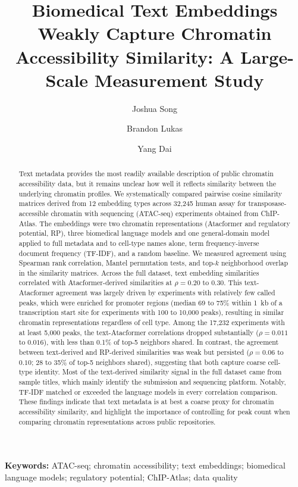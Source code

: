 \documentclass[12pt]{article}
\title{\textbf{Biomedical Text Embeddings Weakly Capture Chromatin Accessibility
Similarity: A Large-Scale Measurement Study}}
\author[1]{Joshua Song}
\author[1]{Brandon Lukas}
\author[1,*]{Yang Dai}
\affil[1]{Department of Biomedical Engineering, University of Illinois Chicago, Chicago, IL, USA}
\affil[*]{Corresponding author: \href{mailto:yangdai@uic.edu}{yangdai@uic.edu}}
\affil[ ]{Other authors: Joshua Song (\href{mailto:joshua.song@nih.gov}{joshua.song@nih.gov}),
Brandon Lukas (\href{mailto:blukas4@uic.edu}{blukas4@uic.edu})}
\date{}
\begin{document}
\maketitle

\begin{abstract}
Text metadata provides the most readily available description of public
chromatin accessibility data, but it remains unclear how well it reflects
similarity between the underlying chromatin profiles. We systematically
compared pairwise cosine similarity matrices derived from 12 embedding types
across 32,245 human assay for transposase-accessible chromatin with sequencing
(ATAC-seq) experiments obtained from ChIP-Atlas. The embeddings were two
chromatin representations (Atacformer and regulatory potential, RP), three
biomedical language models and one general-domain model applied to full
metadata and to cell-type names alone, term frequency-inverse document
frequency (TF-IDF), and a random baseline. We measured agreement using
Spearman rank correlation, Mantel permutation tests, and top-$k$ neighborhood
overlap in the similarity matrices. Across the full dataset, text embedding
similarities correlated with Atacformer-derived similarities at
$\rho = 0.20$ to $0.30$. This text-Atacformer agreement was largely driven by
experiments with relatively few called peaks, which were enriched for promoter
regions (median 69 to 75\% within 1~kb of a transcription start site for
experiments with 100 to 10,000 peaks), resulting in similar chromatin
representations regardless of cell type. Among the 17,232 experiments with at
least 5,000 peaks, the text-Atacformer correlations dropped substantially
($\rho = 0.011$ to $0.016$), with less than 0.1\% of top-5 neighbors shared.
In contrast, the agreement between text-derived and RP-derived similarities
was weak but persisted ($\rho = 0.06$ to $0.10$; 28 to 35\% of top-5
neighbors shared), suggesting that both capture coarse cell-type identity.
Most of the text-derived similarity signal in the full dataset came from
sample titles, which mainly identify the submission and sequencing platform.
Notably, TF-IDF matched or exceeded the language models in every correlation
comparison. These findings indicate that text metadata is at best a coarse
proxy for chromatin accessibility similarity, and highlight the importance of
controlling for peak count when comparing chromatin representations across
public repositories.
\end{abstract}

\noindent\textbf{Keywords:} ATAC-seq; chromatin accessibility; text embeddings;
biomedical language models; regulatory potential; ChIP-Atlas; data quality
\end{document}
